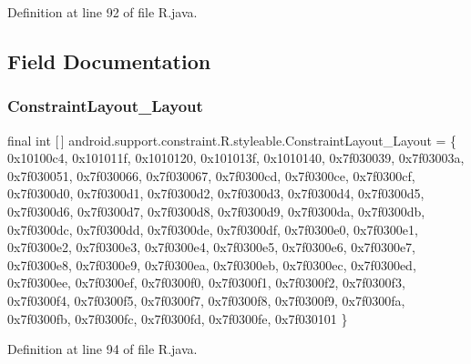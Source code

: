 Definition at line 92 of file R.\+java.


\begin{DoxyCode}{0}

\end{DoxyCode}


\subsection{Field Documentation}
\mbox{\label{classandroid_1_1support_1_1constraint_1_1_r_1_1styleable_a96a3757da6f0c088e10cc55aa2a6ed9f}} 
\subsubsection{\texorpdfstring{ConstraintLayout\_Layout}{ConstraintLayout\_Layout}}
{\footnotesize\ttfamily final int \mbox{[}$\,$\mbox{]} android.\+support.\+constraint.\+R.\+styleable.\+Constraint\+Layout\+\_\+\+Layout = \{ 0x10100c4, 0x101011f, 0x1010120, 0x101013f, 0x1010140, 0x7f030039, 0x7f03003a, 0x7f030051, 0x7f030066, 0x7f030067, 0x7f0300cd, 0x7f0300ce, 0x7f0300cf, 0x7f0300d0, 0x7f0300d1, 0x7f0300d2, 0x7f0300d3, 0x7f0300d4, 0x7f0300d5, 0x7f0300d6, 0x7f0300d7, 0x7f0300d8, 0x7f0300d9, 0x7f0300da, 0x7f0300db, 0x7f0300dc, 0x7f0300dd, 0x7f0300de, 0x7f0300df, 0x7f0300e0, 0x7f0300e1, 0x7f0300e2, 0x7f0300e3, 0x7f0300e4, 0x7f0300e5, 0x7f0300e6, 0x7f0300e7, 0x7f0300e8, 0x7f0300e9, 0x7f0300ea, 0x7f0300eb, 0x7f0300ec, 0x7f0300ed, 0x7f0300ee, 0x7f0300ef, 0x7f0300f0, 0x7f0300f1, 0x7f0300f2, 0x7f0300f3, 0x7f0300f4, 0x7f0300f5, 0x7f0300f7, 0x7f0300f8, 0x7f0300f9, 0x7f0300fa, 0x7f0300fb, 0x7f0300fc, 0x7f0300fd, 0x7f0300fe, 0x7f030101 \}\hspace{0.3cm}{\ttfamily [static]}}



Definition at line 94 of file R.\+java.

\mbox{\label{classandroid_1_1support_1_1constraint_1_1_r_1_1styleable_adf760fb5ee1563b2ba152b3fb0a72f81}} 
